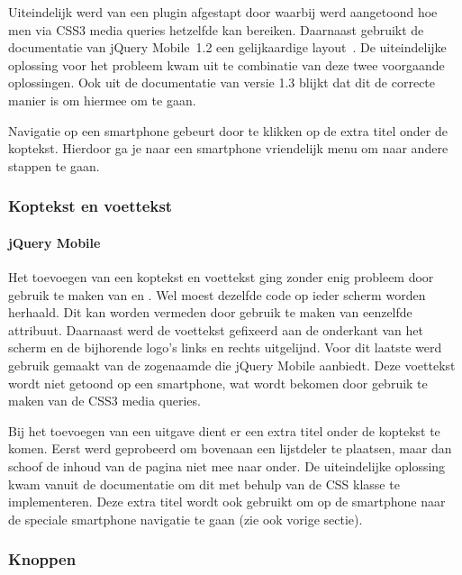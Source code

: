 Uiteindelijk werd van een plugin afgestapt door \cite{Hadlock2012} waarbij werd aangetoond hoe men via CSS3 media queries hetzelfde kan bereiken. 
Daarnaast gebruikt de documentatie van jQuery Mobile~1.2 een gelijkaardige layout~\cite{JQuery2012b}. 
De uiteindelijke oplossing voor het probleem kwam uit te combinatie van deze twee voorgaande oplossingen.
Ook uit de documentatie van versie 1.3 \cite{JQuery2013e} blijkt dat dit de correcte manier is om hiermee om te gaan.

Navigatie op een smartphone gebeurt door te klikken op de extra titel onder de koptekst. 
Hierdoor ga je naar een smartphone vriendelijk menu om naar andere stappen te gaan.

\subsubsection{Koptekst en voettekst}

\paragraph{jQuery Mobile}
Het toevoegen van een koptekst en voettekst ging zonder enig probleem door gebruik te maken van  en . 
Wel moest dezelfde code op ieder scherm worden herhaald. 
Dit kan worden vermeden door gebruik te maken van eenzelfde  attribuut. 
Daarnaast werd de voettekst gefixeerd aan de onderkant van het scherm en de bijhorende logo's links en rechts uitgelijnd. 
Voor dit laatste werd gebruik gemaakt van de zogenaamde  die jQuery Mobile aanbiedt. 
Deze voettekst wordt niet getoond op een smartphone, wat wordt bekomen door gebruik te maken van de CSS3 media queries.

Bij het toevoegen van een uitgave dient er een extra titel onder de koptekst te komen. 
Eerst werd geprobeerd om bovenaan een lijstdeler te plaatsen, maar dan schoof de inhoud van de pagina niet mee naar onder. 
De uiteindelijke oplossing kwam vanuit de documentatie \cite{JQuery2013b} om dit met behulp van de  CSS klasse te implementeren. 
Deze extra titel wordt ook gebruikt om op de smartphone naar de speciale smartphone navigatie te gaan (zie ook vorige sectie).

\subsubsection{Knoppen}

